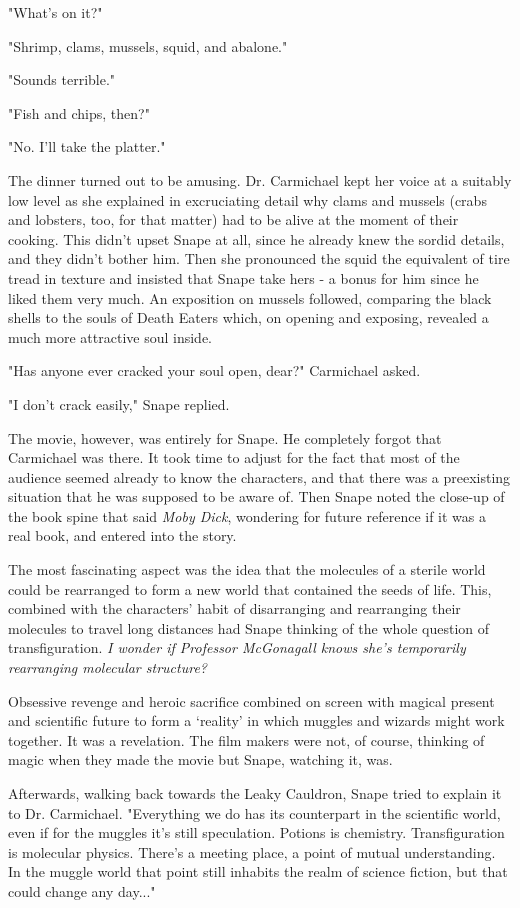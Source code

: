 \documentclass[a4paper,11pt]{article}
\begin{document}
"What's on it?"

"Shrimp, clams, mussels, squid, and abalone."

"Sounds terrible."

"Fish and chips, then?"

"No. I'll take the platter."

The dinner turned out to be amusing. Dr. Carmichael kept her voice at a suitably low level as she explained in excruciating detail why clams and mussels (crabs and lobsters, too, for that matter) had to be alive at the moment of their cooking. This didn't upset Snape at all, since he already knew the sordid details, and they didn't bother him. Then she pronounced the squid the equivalent of tire tread in texture and insisted that Snape take hers - a bonus for him since he liked them very much. An exposition on mussels followed, comparing the black shells to the souls of Death Eaters which, on opening and exposing, revealed a much more attractive soul inside.

"Has anyone ever cracked your soul open, dear?" Carmichael asked.

"I don't crack easily," Snape replied.

The movie, however, was entirely for Snape. He completely forgot that Carmichael was there. It took time to adjust for the fact that most of the audience seemed already to know the characters, and that there was a preexisting situation that he was supposed to be aware of. Then Snape noted the close-up of the book spine that said \emph{Moby Dick}, wondering for future reference if it was a real book, and entered into the story.

The most fascinating aspect was the idea that the molecules of a sterile world could be rearranged to form a new world that contained the seeds of life. This, combined with the characters' habit of disarranging and rearranging their molecules to travel long distances had Snape thinking of the whole question of transfiguration. \emph{I wonder if Professor McGonagall knows she's temporarily rearranging molecular structure?}

Obsessive revenge and heroic sacrifice combined on screen with magical present and scientific future to form a `reality' in which muggles and wizards might work together. It was a revelation. The film makers were not, of course, thinking of magic when they made the movie but Snape, watching it, was.

Afterwards, walking back towards the Leaky Cauldron, Snape tried to explain it to Dr. Carmichael. "Everything we do has its counterpart in the scientific world, even if for the muggles it's still speculation. Potions is chemistry. Transfiguration is molecular physics. There's a meeting place, a point of mutual understanding. In the muggle world that point still inhabits the realm of science fiction, but that could change any day..."
\end{document}
